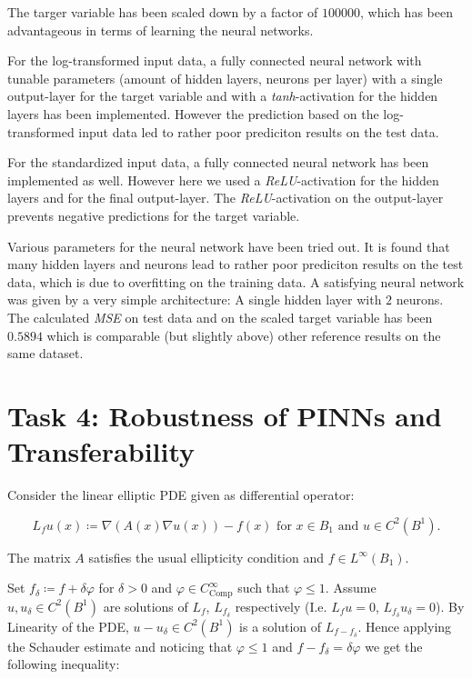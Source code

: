 \documentclass[letterpaper,12pt]{article}
\begin{document}
The targer variable has been scaled down by a factor of $100000$, which has been advantageous in terms of learning the neural networks.

For the log-transformed input data, a fully connected neural network with tunable parameters (amount of hidden layers, neurons per layer) with a single output-layer for the target variable and with a \textit{tanh}-activation for the hidden layers has been implemented. However the prediction based on the log-transformed input data led to rather poor prediciton results on the test data.

For the standardized input data, a fully connected neural network has been implemented as well. However here we used a \textit{ReLU}-activation for the hidden layers and for the final output-layer. The \textit{ReLU}-activation on the output-layer prevents negative predictions for the target variable.

Various parameters for the neural network have been tried out. It is found that many hidden layers and neurons lead to rather poor prediciton results on the test data, which is due to overfitting on the training data. A satisfying neural network was given by a very simple architecture: A single hidden layer with $2$ neurons. The calculated \textit{MSE} on test data and on the scaled target variable has been $0.5894$ which is comparable (but slightly above) other reference results on the same dataset.


\section*{Task 4: Robustness of PINNs and Transferability}
Consider the linear elliptic PDE given as differential operator:

\begin{equation*}
L_{f}u(x)\coloneqq\nabla (A(x) \nabla u(x)) - f(x) \text { for }x\in B_{1} \text { and }u \in C^{2}\left(B^{1}\right).
\end{equation*}

The matrix $A$ satisfies the usual ellipticity condition and $f\in L^{\infty}\left(B_{1}\right)$.

Set $f_{\delta}\coloneqq f+\delta \varphi$ for $\delta>0$ and $\varphi\in C^{\infty}_\text{Comp}$ such that $\varphi \leq 1$. Assume $u, u_{\delta} \in C^{2}\left(B^{1}\right)$ are solutions of $L_{f}$, $L_{f_\delta}$ respectively (I.e. $L_{f}u=0$, $L_{f_\delta}u_\delta=0$). 
By Linearity of the PDE, $u-u_{\delta}\in C^{2}\left(B^{1}\right)$ is a solution of $L_{f-f_\delta}$.
Hence applying the Schauder estimate and noticing that $\varphi \leq 1$ and $f-f_\delta = \delta \varphi$ we get the following inequality:
\end{document}

